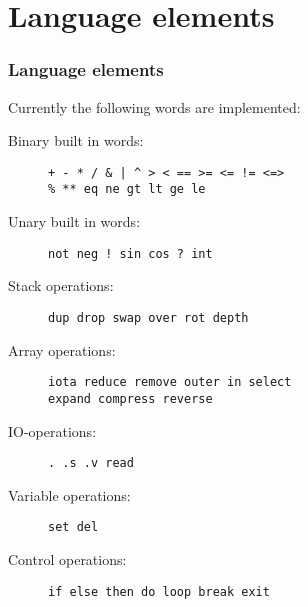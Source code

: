 \documentclass{beamer}
\newcommand*{\NIX}{\vspace*{.3cm}\\}
\begin{document}
 \section{Language elements}
  \begin{frame}[containsverbatim]
   \frametitle{Language elements}
   Currently the following words are implemented:
   \NIX
   \begin{description}
    \item [Binary built in words:] 
     \begin{verbatim}
+ - * / & | ^ > < == >= <= != <=> 
% ** eq ne gt lt ge le
     \end{verbatim}
    \item [Unary built in words:]
     \begin{verbatim}
not neg ! sin cos ? int
     \end{verbatim}
    \item [Stack operations:]
     \begin{verbatim}
dup drop swap over rot depth
     \end{verbatim}
    \item [Array operations:]
     \begin{verbatim}
iota reduce remove outer in select 
expand compress reverse
     \end{verbatim}
    \item [IO-operations:]
     \begin{verbatim}
. .s .v read
     \end{verbatim}
    \item [Variable operations:]
     \begin{verbatim}
set del
     \end{verbatim}
    \item [Control operations:]
     \begin{verbatim}
if else then do loop break exit
     \end{verbatim}
   \end{description}
  \end{frame}
%
\end{document}
